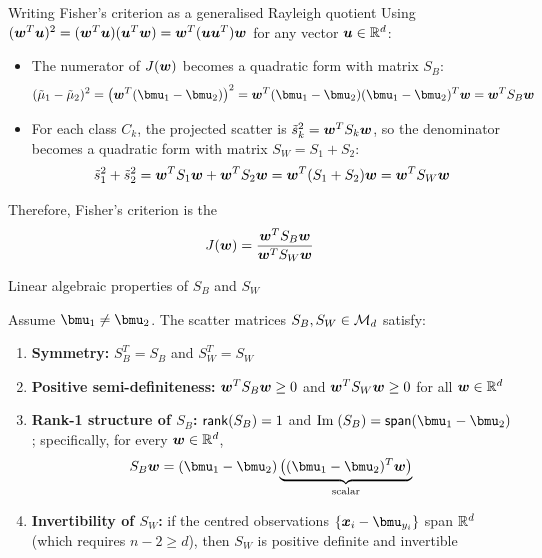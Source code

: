 \documentclass[aspectratio=169]{beamer}\usepackage[]{graphicx}\usepackage[]{xcolor}
\begin{document}
\begin{frame}{Writing Fisher's criterion as a generalised Rayleigh quotient}
    Using $(\bm{w}^T \bm{u})^2 = (\bm{w}^T \bm{u})(\bm{u}^T \bm{w}) = \bm{w}^T(\bm{u} \bm{u}^T)\bm{w}$ for any vector $\bm{u} \in \mathbb{R}^d$:
    \vfill
    \begin{itemize}
        \item The numerator of $J(\bm{w})$ becomes a quadratic form with matrix $S_B$:
        \[
            (\tilde{\mu}_1 - \tilde{\mu}_2)^2 = \left(\bw^T(\bmu_1 - \bmu_2)\right)^2 = \bw^T(\bmu_1 - \bmu_2)(\bmu_1 - \bmu_2)^T \bw = \bw^T S_B \bw
        \]
        \item For each class $C_k$, the projected scatter is $\tilde{s}_k^2 = \bm{w}^T S_k \bm{w}$, so the denominator becomes a quadratic form with matrix $S_W = S_1 + S_2$:
        \[
            \tilde{s}_1^2 + \tilde{s}_2^2 = \bm{w}^T S_1 \bm{w} + \bm{w}^T S_2 \bm{w} = \bm{w}^T(S_1 + S_2)\bm{w} = \bm{w}^T S_W \bm{w}
        \]
    \end{itemize}
    \vfill
    Therefore, Fisher's criterion is the 
    \[
        J(\bm{w}) = \frac{\bm{w}^T S_B \bm{w}}{\bm{w}^T S_W \bm{w}}
    \]
\end{frame}


\begin{frame}{Linear algebraic properties of $S_B$ and $S_W$}
    \begin{proposition}
        Assume $\bmu_1 \neq \bmu_2$. The scatter matrices $S_B, S_W \in \mathcal{M}_d$ satisfy:
        \begin{enumerate}
            \item \textbf{Symmetry:} $S_B^T = S_B$ and $S_W^T = S_W$
            \item \textbf{Positive semi-definiteness:} $\bm{w}^T S_B \bm{w} \ge 0$ and $\bm{w}^T S_W \bm{w} \ge 0$ for all $\bm{w} \in \mathbb{R}^d$
            \item \textbf{Rank-1 structure of $S_B$:} $\mathsf{rank}(S_B) = 1$ and $\Im(S_B) = \Span(\bmu_1 - \bmu_2)$; specifically, for every $\bm{w} \in \mathbb{R}^d$,
            \[
                S_B \bw = (\bmu_1 - \bmu_2)\underbrace{\left((\bmu_1 - \bmu_2)^T \bw\right)}_{\text{scalar}}
            \]
            \item \textbf{Invertibility of $S_W$:} if the centred observations $\{\bx_i - \bmu_{y_i}\}$ span $\mathbb{R}^d$ (which requires $n - 2 \ge d$), then $S_W$ is positive definite and invertible
        \end{enumerate}
    \end{proposition}
\end{frame}
\end{document}
